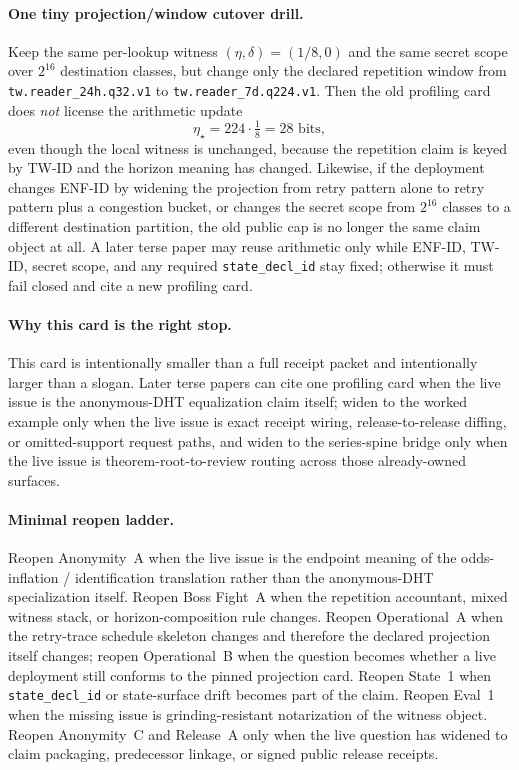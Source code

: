 \documentclass[11pt]{article}
\begin{document}
\paragraph{One tiny projection/window cutover drill.}
Keep the same per-lookup witness $(\eta,\delta)=(1/8,0)$ and the same secret scope over $2^{16}$ destination classes, but change only the declared repetition window from \texttt{tw.reader\_24h.q32.v1} to \texttt{tw.reader\_7d.q224.v1}.
Then the old profiling card does \emph{not} license the arithmetic update
\[
\eta_\star = 224\cdot \tfrac18 = 28 \text{ bits},
\]
even though the local witness is unchanged, because the repetition claim is keyed by TW-ID and the horizon meaning has changed.
Likewise, if the deployment changes ENF-ID by widening the projection from retry pattern alone to retry pattern plus a congestion bucket, or changes the secret scope from $2^{16}$ classes to a different destination partition, the old public cap is no longer the same claim object at all.
A later terse paper may reuse arithmetic only while ENF-ID, TW-ID, secret scope, and any required \texttt{state\_decl\_id} stay fixed; otherwise it must fail closed and cite a new profiling card.

\paragraph{Why this card is the right stop.}
This card is intentionally smaller than a full receipt packet and intentionally larger than a slogan.
Later terse papers can cite one profiling card when the live issue is the anonymous-DHT equalization claim itself; widen to the worked example only when the live issue is exact receipt wiring, release-to-release diffing, or omitted-support request paths, and widen to the series-spine bridge only when the live issue is theorem-root-to-review routing across those already-owned surfaces.\cite{series:workedexample,series:seriesspines}

\paragraph{Minimal reopen ladder.}
Reopen Anonymity~A when the live issue is the endpoint meaning of the odds-inflation / identification translation rather than the anonymous-DHT specialization itself. Reopen Boss Fight~A when the repetition accountant, mixed witness stack, or horizon-composition rule changes. Reopen Operational~A when the retry-trace schedule skeleton changes and therefore the declared projection itself changes; reopen Operational~B when the question becomes whether a live deployment still conforms to the pinned projection card. Reopen State~1 when \texttt{state\_decl\_id} or state-surface drift becomes part of the claim. Reopen Eval~1 when the missing issue is grinding-resistant notarization of the witness object. Reopen Anonymity~C and Release~A only when the live question has widened to claim packaging, predecessor linkage, or signed public release receipts.\cite{series:oddsinflation,series:bossfightA,series:operationalA,series:operationalB,series:state1,series:eval1,series:abomoinl,series:releaseA}
\end{document}
